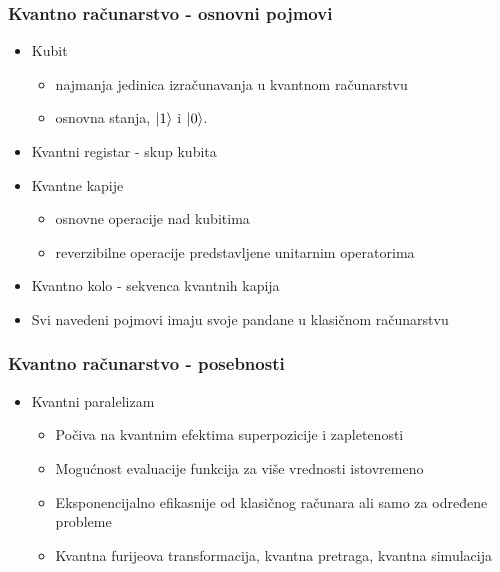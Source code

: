 \documentclass[12pt,hyperref={unicode}]{beamer}
\begin{document}

\begin{frame}
\frametitle{Kvantno računarstvo - osnovni pojmovi}
\begin{itemize}
\item{Kubit}
\begin{itemize}
    \item{najmanja jedinica izračunavanja u kvantnom računarstvu}\\
    \item{osnovna stanja, $\ket{1}$ i $\ket{0}$.}\\
    \end{itemize}
\item{Kvantni registar - skup kubita}
\item{Kvantne kapije}
\begin{itemize}
    \item{osnovne operacije nad kubitima}
    \item{reverzibilne operacije predstavljene unitarnim operatorima}
    \end{itemize}
\item{Kvantno kolo - sekvenca kvantnih kapija}
\item{Svi navedeni pojmovi imaju svoje pandane u klasičnom računarstvu}
\end{itemize}
\end{frame}



\begin{frame}
\frametitle{Kvantno računarstvo - posebnosti}
\begin{itemize}
\item{Kvantni paralelizam \cite[Ch.1.4.2]{p2}}
\begin{itemize}
    \item{Počiva na kvantnim efektima superpozicije i zapletenosti}\\
    \item{Mogućnost evaluacije funkcija za više vrednosti istovremeno}\\
    \item{Eksponencijalno efikasnije od klasičnog računara ali samo za određene probleme}
    \item{Kvantna furijeova transformacija, kvantna pretraga, kvantna simulacija \cite[Ch.1.4.5]{p2}}
	    \end{itemize}
    \end{itemize}
\end{frame}
\end{document}
